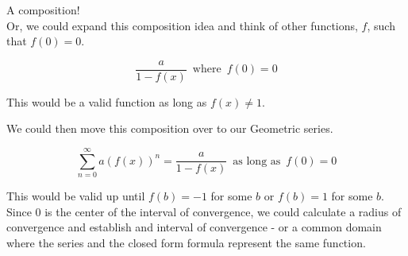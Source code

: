 \documentclass{ximera}
\begin{document}
 A composition! \\




Or, we could expand this composition idea and think of other functions, $f$, such that $f(0) = 0$.



\[    \frac{a}{1-f(x)}   \, \text{ where } \, f(0) = 0       \]


This would be a valid function as long as $f(x) \ne 1$. 




We could then move this composition over to our Geometric series.




\[   \sum_{n=0}^{\infty} a (f(x))^n =  \frac{a}{1-f(x)}   \, \text{ as long as } \, f(0) = 0       \]


This would be valid up until $f(b)=-1$ for some $b$ or $f(b)=1$ for some $b$.  Since $0$ is the center of the interval of convergence, we could calculate a radius of convergence and establish and interval of convergence - or a common domain where the series and the closed form formula represent the same function.
\end{document}
